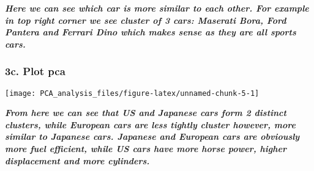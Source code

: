 \documentclass[
  5pt,
]{article}
\newenvironment{Shaded}{\begin{snugshade}}{\end{snugshade}}
\newcommand{\AttributeTok}[1]{\textcolor[rgb]{0.13,0.29,0.53}{#1}}
\newcommand{\CommentTok}[1]{\textcolor[rgb]{0.56,0.35,0.01}{\textit{#1}}}
\newcommand{\ConstantTok}[1]{\textcolor[rgb]{0.56,0.35,0.01}{#1}}
\newcommand{\DecValTok}[1]{\textcolor[rgb]{0.00,0.00,0.81}{#1}}
\newcommand{\FloatTok}[1]{\textcolor[rgb]{0.00,0.00,0.81}{#1}}
\newcommand{\FunctionTok}[1]{\textcolor[rgb]{0.13,0.29,0.53}{\textbf{#1}}}
\newcommand{\NormalTok}[1]{#1}
\newcommand{\OtherTok}[1]{\textcolor[rgb]{0.56,0.35,0.01}{#1}}
\newcommand{\SpecialCharTok}[1]{\textcolor[rgb]{0.81,0.36,0.00}{\textbf{#1}}}
\newcommand{\StringTok}[1]{\textcolor[rgb]{0.31,0.60,0.02}{#1}}
\begin{document}
\textbf{\emph{Here we can see which car is more similar to each other.
For example in top right corner we see cluster of 3 cars: Maserati Bora,
Ford Pantera and Ferrari Dino which makes sense as they are all sports
cars.}}

\pagebreak

\subsubsection{3c. Plot pca}\label{c.-plot-pca}

\begin{Shaded}
\end{Shaded}

\begin{center}\texttt{[image: PCA\_analysis\_files/figure-latex/unnamed-chunk-5-1]} \end{center}

\textbf{\emph{From here we can see that US and Japanese cars form 2
distinct clusters, while European cars are less tightly cluster however,
more similar to Japanese cars. Japanese and European cars are obviously
more fuel efficient, while US cars have more horse power, higher
displacement and more cylinders.}}
\end{document}
